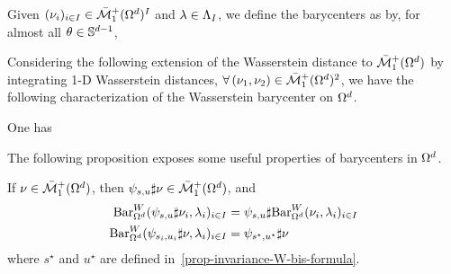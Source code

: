 \begin{defn}
Given $(\nu_i)_{i \in I} \in  \bar{\mathcal{M}}_1^+(\Omega^d)^I$ and $\lambda \in \Lambda_I$, we define the barycenters as
by, for almost all  $\theta \in \mathbb{S}^{d-1}$, 
\end{defn}

Considering the following extension of the Wasserstein distance to $\bar{\mathcal{M}}_1^+(\Omega^d)$ by integrating 1-D Wasserstein distances, $\forall \, (\nu_1,\nu_2) \in \bar{\mathcal{M}}_1^+(\Omega^d)^2$, 
we have the following characterization of the Wasserstein barycenter on $\Omega^d$.

\begin{prop}\label{prop-bary-omegad-variational}
One has
\end{prop}

The following proposition exposes some useful properties of barycenters in $\Omega^d$.

\begin{prop}\label{prop-bary-omd}
	If $\nu \in \bar{\mathcal{M}}_{1}^+(\Omega^d)$, then $\psi_{s,u} \sharp \nu \in \bar{\mathcal{M}}_{1}^+(\Omega^d)$, and
	\begin{align}
		\label{propBar1} 
		\text{\upshape Bar}_{\Omega^d}^W(\psi_{s,u} \sharp \nu_i,\lambda_i)_{i \in I} &= \psi_{s,u} \sharp \text{\upshape Bar}_{\Omega^d}^W(\nu_i, \lambda_i)_{i \in I} \\
		\label{propBar2} 
		\text{\upshape Bar}_{\Omega^d}^W(\psi_{s_i,u_i} \sharp \nu,\lambda_i)_{i \in I} &= \psi_{s^\star,u^\star} \sharp \nu 
	\end{align}
	where $s^\star$ and $u^\star$ are defined in~\eqref{prop-invariance-W-bis-formula}. 
\end{prop}


